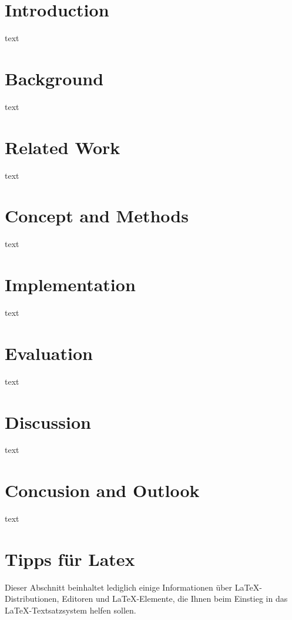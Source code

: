 \documentclass[conference]{IEEEtran}
\begin{document}
\section{Introduction}
\label{ref:introduction}
text

\section{Background}
\label{ref:background}
text

\section{Related Work}
\label{ref:relatedwork}
text

\section{Concept and Methods}
\label{ref:concept}
text
 
\section{Implementation}
\label{ref:implementation}
text

\section{Evaluation}
\label{ref:evaluation}
text

\section{Discussion}
\label{ref:discussion}
text

\section{Concusion and Outlook}
\label{ref:conclusion}
text

\section*{Tipps für Latex}
Dieser Abschnitt beinhaltet lediglich einige Informationen über \LaTeX-Distributionen, Editoren und \LaTeX-Elemente, die Ihnen beim Einstieg in das \LaTeX-Textsatzsystem helfen sollen.
\end{document}

